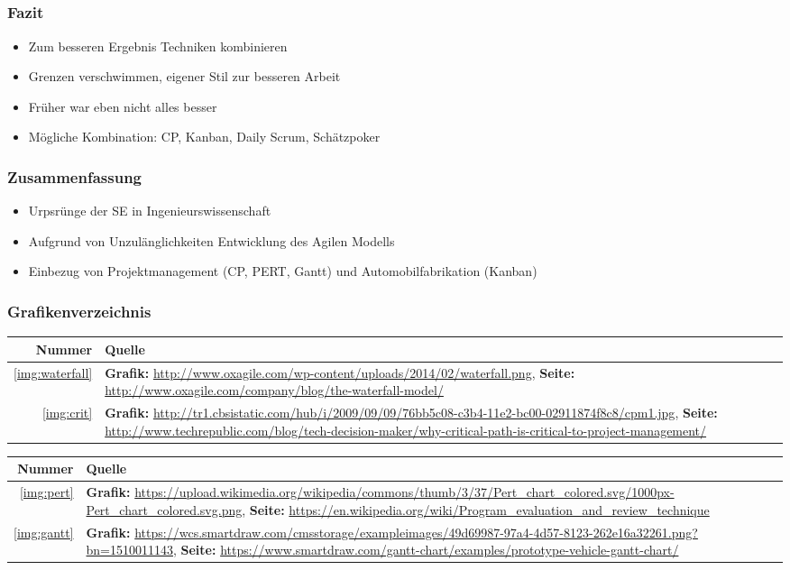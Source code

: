 \documentclass[%
	handout
]{beamer}
\begin{document}
	\subsection{}
		\begin{frame}
			\frametitle{Fazit}
			\begin{itemize}
				\item Zum besseren Ergebnis Techniken kombinieren
				\item Grenzen verschwimmen, eigener Stil zur besseren Arbeit
				\item Früher war eben nicht alles besser
				\item Mögliche Kombination: CP, Kanban, Daily Scrum, Schätzpoker
			\end{itemize}
		\end{frame}
		\begin{frame}
			\frametitle{Zusammenfassung}
			\begin{itemize}
				\item Urpsrünge der SE in Ingenieurswissenschaft
				\item Aufgrund von Unzulänglichkeiten Entwicklung des Agilen Modells
				\item Einbezug von Projektmanagement (CP, PERT, Gantt) und Automobilfabrikation (Kanban)
			\end{itemize}
		\end{frame}
		\begin{frame}
			\frametitle{Grafikenverzeichnis}
			\begin{tabular}{r|p{}}
				\textbf{Nummer}		&	\textbf{Quelle}	\\ \hline
		
				\ref{img:waterfall}	&	\textbf{Grafik:} \url{http://www.oxagile.com/wp-content/uploads/2014/02/waterfall.png},
										\textbf{Seite:} \url{http://www.oxagile.com/company/blog/the-waterfall-model/}	\\\hline
				\ref{img:crit}		&	\textbf{Grafik:} \url{http://tr1.cbsistatic.com/hub/i/2009/09/09/76bb5c08-c3b4-11e2-bc00-02911874f8c8/cpm1.jpg},
										\textbf{Seite:} \url{http://www.techrepublic.com/blog/tech-decision-maker/why-critical-path-is-critical-to-project-management/}
			\end{tabular}
		\end{frame}
		\begin{frame}
			\begin{tabular}{r|p{.85\textwidth}}
				\textbf{Nummer}		&	\textbf{Quelle}	\\ \hline
				\ref{img:pert}		&	\textbf{Grafik:} \url{https://upload.wikimedia.org/wikipedia/commons/thumb/3/37/Pert_chart_colored.svg/1000px-Pert_chart_colored.svg.png},
										\textbf{Seite:}	 \url{https://en.wikipedia.org/wiki/Program_evaluation_and_review_technique}\\\hline
				\ref{img:gantt}		&	\textbf{Grafik:} \url{https://wcs.smartdraw.com/cmsstorage/exampleimages/49d69987-97a4-4d57-8123-262e16a32261.png?bn=1510011143},
										\textbf{Seite:} \url{https://www.smartdraw.com/gantt-chart/examples/prototype-vehicle-gantt-chart/}
			\end{tabular}
		\end{frame}
\end{document}
